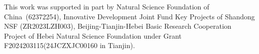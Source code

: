 \documentclass[manuscript,screen,review,anonymous]{acmart}
\begin{document}
\begin{acks}
This work was supported in part by Natural Science Foundation of China~(62372254),  Innovative Development Joint Fund Key Projects of Shandong NSF (ZR2023LZH003), Beijing-Tianjin-Hebei Basic Research Cooperation Project of Hebei Natural Science Foundation under Grant F2024203115(24JCZXJC00160 in Tianjin). 
\end{acks}



\end{document}
